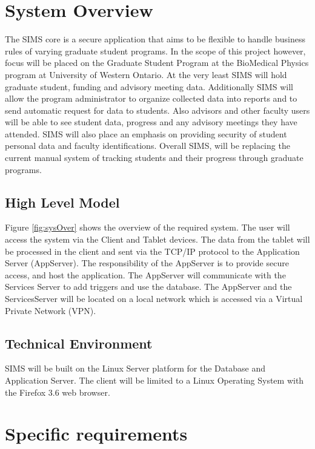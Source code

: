 \documentclass{journal}
\begin{document}
\clearpage

\section{System Overview}

The SIMS core is a secure application that aims to be flexible to handle business rules of varying graduate student programs. In the scope of this project however, focus will be placed on the Graduate Student Program at the BioMedical Physics program at University of Western Ontario. At the very least SIMS will hold graduate student, funding and advisory meeting data. Additionally SIMS will allow the program administrator to organize collected data into reports and to send automatic request for data to students. Also advisors and other faculty users will be able to see student data, progress and any advisory meetings they have attended. SIMS will also place an emphasis on providing security of student personal data and faculty identifications. Overall SIMS, will be replacing the current manual system of tracking students and their progress through graduate programs.

\subsection{High Level Model}

Figure \ref{fig:sysOver} shows the overview of the required system. The user will access the system via the Client and Tablet devices. The data from the tablet will be processed in the client and sent via the TCP/IP protocol to the Application Server (AppServer). The responsibility of the AppServer is to provide secure access, and host the application. The AppServer will communicate with the Services Server to add triggers and use the database. The AppServer and the ServicesServer will be located on a local network which is accessed via a Virtual Private Network (VPN).


\subsection{Technical Environment}

SIMS will be built on the Linux Server platform for the Database and Application Server. The client will be limited to a Linux Operating System with the Firefox 3.6 web browser.  

\section{Specific requirements}
\end{document}
